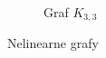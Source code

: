 \begin{figure}[h]
\begin{subfigure}[b]{0.3\textwidth}
        \caption{Graf $K_{3,3}$}
        \label{fig:graph_k3,3}
    \end{subfigure}
    \caption{Nelinearne grafy}
    \label{fig:non_planar_graphs}
\end{figure}